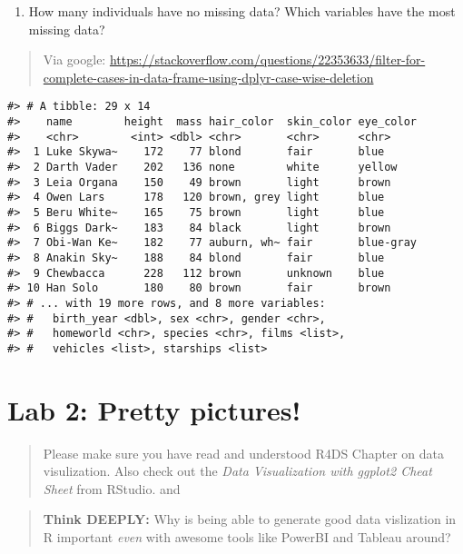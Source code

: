 \documentclass[
]{book}
\providecommand{\tightlist}{%
  \setlength{\itemsep}{0pt}\setlength{\parskip}{0pt}}
\begin{document}
\begin{enumerate}
\def\labelenumi{\arabic{enumi}.}
\setcounter{enumi}{9}
\tightlist
\item
  How many individuals have no missing data? Which variables have the most missing data?
\end{enumerate}

\begin{quote}
Via google: \url{https://stackoverflow.com/questions/22353633/filter-for-complete-cases-in-data-frame-using-dplyr-case-wise-deletion}
\end{quote}

\begin{verbatim}
#> # A tibble: 29 x 14
#>    name        height  mass hair_color  skin_color eye_color
#>    <chr>        <int> <dbl> <chr>       <chr>      <chr>    
#>  1 Luke Skywa~    172    77 blond       fair       blue     
#>  2 Darth Vader    202   136 none        white      yellow   
#>  3 Leia Organa    150    49 brown       light      brown    
#>  4 Owen Lars      178   120 brown, grey light      blue     
#>  5 Beru White~    165    75 brown       light      blue     
#>  6 Biggs Dark~    183    84 black       light      brown    
#>  7 Obi-Wan Ke~    182    77 auburn, wh~ fair       blue-gray
#>  8 Anakin Sky~    188    84 blond       fair       blue     
#>  9 Chewbacca      228   112 brown       unknown    blue     
#> 10 Han Solo       180    80 brown       fair       brown    
#> # ... with 19 more rows, and 8 more variables:
#> #   birth_year <dbl>, sex <chr>, gender <chr>,
#> #   homeworld <chr>, species <chr>, films <list>,
#> #   vehicles <list>, starships <list>
\end{verbatim}

\hypertarget{lab-2-pretty-pictures}{%
\chapter{Lab 2: Pretty pictures!}\label{lab-2-pretty-pictures}}

\begin{quote}
Please make sure you have read and understood R4DS Chapter
on data visulization. Also check out the \emph{Data
Visualization with ggplot2 Cheat Sheet} from RStudio.
and
\end{quote}

\begin{quote}
\textbf{Think DEEPLY:} Why is being able to generate good data vislization in R important \emph{even} with awesome tools like PowerBI and Tableau around?
\end{quote}
\end{document}

